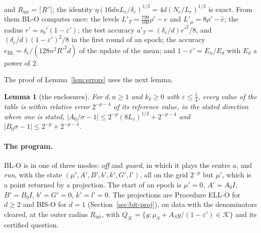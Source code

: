 \documentclass[11pt]{amsart}
\newtheorem{lemma}[theorem]{Lemma}
\theoremstyle{definition}
\numberwithin{equation}{section}
\newcommand{\cK}{\mathcal{K}}
\begin{document}
and $R_{\mathrm{int}}=\lceil R'\rceil$; the identity $\eta(16dnL_e/\delta_e)^{1/2}=4d(N_e/L_e)^{1/2}$ is exact. From them BL-O computes once: the levels $L'_T=\frac{799}{100}\rho'-\hat e$ and $L'_\mu=8\rho'-\hat e$; the radius $r'=s_b'(1-\varepsilon')$; the test accuracy $a'_T=(\delta_e/d)r'^2/8$, and $(\delta_e/d)(1-\varepsilon')^2/8$ in the first round of an epoch; the accuracy $e_{\mathrm{BL}}=\delta_e/(128n^2R'^2d)$ of the update of the mean; and $1-\varepsilon'=E_n/E_d$ with $E_d$ a power of $2$.

The proof of Lemma~\ref{lem:errors} uses the next lemma.

\begin{lemma}[the enclosures]\label{lem:enc}
For $d,n\ge1$ and $k_\delta\ge0$ with $\varepsilon\le\frac14$, every value of the table is within relative error $2^{-p-4}$ of its reference value, in the stated direction where one is stated, $|A_0/\sigma-1|\le2^{-p}(8L_e)^{1/2}+2^{-p-4}$ and $|B_0\sigma-1|\le2^{-p}+2^{-p-4}$.
\end{lemma}

\paragraph{The program.} BL-O is in one of three modes: \emph{off} and \emph{guard}, in which it plays the centre $a$, and \emph{run}, with the state $(\mu',A',B',b',k',G',l')$, all on the grid $2^{-p}$ but $\mu'$, which is a point returned by a projection. The start of an epoch is $\mu'=0$, $A'=A_0I$, $B'=B_0I$, $b'=G'=0$, $k'=l'=0$. The projections are Procedure ELL-O for $d\ge2$ and BIS-O for $d=1$ (Section~\ref{sec:bit-proj}), on data with the denominators cleared, at the outer radius $R_{\mathrm{int}}$, with $Q_\cK=\{y:\mu_S+A_Sy/(1-\varepsilon')\in\cK\}$ and its certified question.
\end{document}
